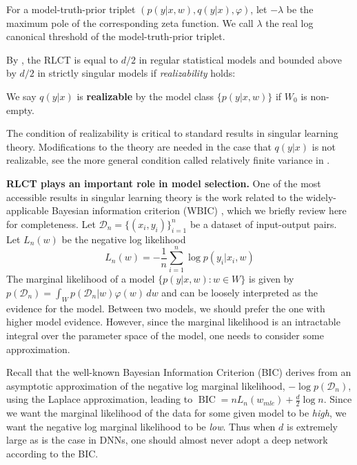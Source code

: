 \documentclass{article} %
\begin{document}
\begin{definition}
For a model-truth-prior triplet $(p(y|x,w),q(y|x),\varphi)$, let $-\lambda$ be the maximum pole of the corresponding zeta function. We call $\lambda$ the real log canonical threshold of the model-truth-prior triplet.
\label{def:RLCT}
\end{definition}

By {\citet[Theorem 6.4]{watanabe_algebraic_2009}}, the RLCT is equal to $d/2$ in regular statistical models and bounded above by $d/2$ in strictly singular models if \textit{realizability} holds:
 \begin{definition}
	We say $q(y|x)$ is \textbf{realizable} by the model class $\{p(y|x,w)\}$ if $W_0$ is non-empty.
\end{definition}
The condition of realizability is critical to standard results in singular learning theory. Modifications to the theory are needed in the case that $q(y|x)$ is not realizable, see the more general condition called relatively finite variance in \citet{watanabe_mathematical_2018}.

\textbf{RLCT plays an important role in model selection.}
One of the most accessible results in singular learning theory is the work related to the widely-applicable Bayesian information criterion (WBIC) \citet{watanabe_widely_2013}, which we briefly review here for completeness.
Let $\mathcal D_n =  \{(x_i,y_i)\}_{i=1}^n$ be a dataset of input-output pairs.  
Let $L_n(w)$ be the negative log likelihood
\begin{equation}
L_n(w) = -\frac{1}{n} \sum_{i=1}^n \log p(y_i |x_i, w)
\label{eq:nll}
\end{equation}
The marginal likelihood of a model $\{p(y|x,w): w \in W\}$ is given by
$
p(\mathcal D_n) = \int_W p(\mathcal D_n|w) \varphi(w) \,dw
$
and can be loosely interpreted as the evidence for the model. Between two models, we should prefer the one with higher model evidence.
However, since the marginal likelihood is an intractable integral over the parameter space of the model, one needs to consider some approximation.

Recall that the well-known Bayesian Information Criterion (BIC) derives from an asymptotic approximation of the negative log marginal likelihood, $-\log p(\mathcal D_n)$, using the Laplace approximation, leading to
$
\operatorname{BIC} = nL_n( w_{mle}) + \frac{d}{2} \log n.
$
Since we want the marginal likelihood of the data for some given model to be \textit{high}, we want the negative log marginal likelihood to be \textit{low}. Thus when $d$ is extremely large as is the case in DNNs, one should almost never adopt a deep network according to the BIC. 
\end{document}
